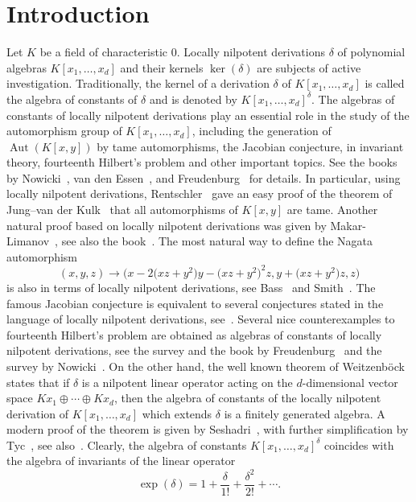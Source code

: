 \documentclass[pdftex]{sigma}
\numberwithin{equation}{section}
\begin{document}

\renewcommand{\thefootnote}{\arabic{footnote}}
\setcounter{footnote}{0}

\section{Introduction}
Let $K$ be a field of characteristic 0. Locally nilpotent derivations $\delta$ of polynomial algebras $K[x_1,\ldots,x_d]$ and their kernels $\ker(\delta)$ are subjects of active investigation. Traditionally, the kernel of a derivation $\delta$ of $K[x_1,\ldots,x_d]$ is called the algebra of constants of $\delta$ and is denoted by $K[x_1,\ldots,x_d]^{\delta}$. The algebras of constants of locally nilpotent derivations play an essential role in the study of the automorphism group of $K[x_1,\ldots,x_d]$,
including the generation of $\operatorname{Aut}(K[x,y])$ by tame automorphisms, the Jacobian conjecture, in invariant theory, fourteenth Hilbert's problem and other important topics. See the books by Nowicki~\cite{No1}, van den Essen~\cite{E}, and Freudenburg~\cite{Fr2} for details. In particular, using locally nilpotent derivations,
Rentschler~\cite{R} gave an easy proof of the theorem of Jung--van der Kulk~\cite{J, K} that all automorphisms of $K[x,y]$ are tame. Another natural proof based on locally nilpotent derivations was given by Makar-Limanov~\cite{ML2}, see also the book~\cite{D1}. The most natural way to define the Nagata automorphism~\cite{Na}
\[
(x,y,z)\to\big(x-2\big(xz+y^2\big)y-\big(xz+y^2\big)^2z,y+\big(xz+y^2\big)z,z\big)
\]
is also in terms of locally nilpotent derivations, see Bass~\cite{B} and Smith~\cite{Sm}. The famous Jacobian conjecture is equivalent to several conjectures stated in the language of locally nilpotent derivations, see~\cite{E}. Several nice counterexamples to fourteenth Hilbert's problem are obtained as algebras of constants of locally nilpotent derivations, see the survey and the book by Freudenburg~\cite{Fr1, Fr2} and the survey by Nowicki~\cite{No2}. On the other hand, the well known theorem of Weitzenb\"ock~\cite{W} states that if $\delta$ is a nilpotent linear operator acting on the $d$-dimensional vector space $Kx_1\oplus \cdots\oplus Kx_d$, then the algebra of constants of the locally nilpotent derivation of $K[x_1,\ldots,x_d]$ which extends $\delta$ is a finitely generated algebra. A modern proof of the theorem is given by Seshadri~\cite{Ses}, with further simplification by Tyc~\cite{T}, see also~\cite{No1}. Clearly, the algebra of constants $K[x_1,\ldots,x_d]^{\delta}$ coincides with the algebra of invariants of the linear operator
\[
\exp(\delta)=1+\frac{\delta}{1!}+\frac{\delta^2}{2!}+\cdots .
\]
\end{document}
